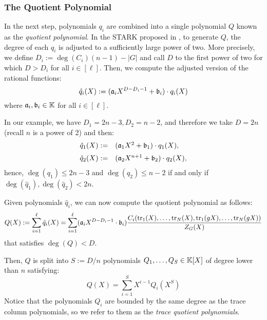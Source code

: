 \subsubsection*{The Quotient Polynomial}\label{sec:constraint-polynomial}

In the next step, polynomials $q_i$ are combined into a single polynomial $Q$ known as the \textit{quotient polynomial}. In the STARK proposed in \cite{EPRINT:StarkWare21}, to generate $Q$, the degree of each $q_i$ is adjusted to a sufficiently large power of two.
More precisely, we define $D_i := \deg(C_i)(n-1) - |G|$ and call $D$ to the first power of two for which $D > D_i$ for all $i \in [\ell]$. 
Then, we compute the adjusted version of the rational functions:
\begin{equation}\label{eq:adjusted}
\hat{q}_i(X) := (\mathfrak{a}_iX^{D-D_i-1} + \mathfrak{b}_i) \cdot q_i(X)
\end{equation}
where $\mathfrak{a}_i, \mathfrak{b}_i \in \mathbb{K}$ for all $i\in[\ell]$.

In our example, we have $D_1 = 2n-3,D_2=n-2$, and therefore we take $D = 2n$ (recall $n$ is a power of 2) and then: 
\begin{align*}
\begin{array}{rl}
\hat{q}_1(X) := &(\mathfrak{a}_1 X^2 + \mathfrak{b}_1) \cdot q_1(X) , \\[0.2cm]
\hat{q}_2(X) := &(\mathfrak{a}_2 X^{n+1} + \mathfrak{b}_2) \cdot q_2(X) ,
\end{array}
\end{align*} 
hence, $\deg(q_1) \leq 2n-3$ and $\deg(q_2) \leq n - 2$ if and only if $\deg(\hat{q}_1),\deg(\hat{q}_2) < 2n$.

Given polynomials $\hat{q}_i$, we can now compute the quotient polynomial as follows:
\begin{equation}\label{eq:quotient-polynomial}
Q(X) := \sum_{i=1}^{\ell} \hat{q}_i(X) = \sum_{i=1}^{\ell} (\mathfrak{a}_iX^{D-D_i-1} \cdot  \mathfrak{b}_i) \frac{C_i(\text{tr}_1(X), \dots, \text{tr}_N(X), \text{tr}_1(gX), \dots, \text{tr}_N(gX))}{Z_{G}(X)}
\end{equation}
that satisfies $\deg(Q) < D$. 

Then, $Q$ is split into $S := D/n$ polynomials $Q_1,\dots,Q_S \in \mathbb{K}[X]$ of degree lower than $n$ satisfying:
\begin{equation}\label{eq:trace-quotient-polynomial}
Q(X) = \sum_{i=1}^S X^{i-1} Q_i(X^S)
\end{equation}
Notice that the polynomials $Q_i$ are bounded by the same degree as the trace column polynomials, so we refer to them as the \textit{trace quotient polynomials}. 

